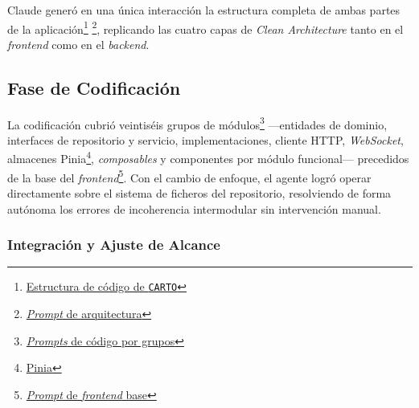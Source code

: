 Claude generó en una única interacción la estructura completa de ambas partes de la aplicación\footnote{\href{https://github.com/alu0101549491/TFG-Fabian-Gonzalez-Lence/blob/main/resources/project-structures/4-CartographicProjectManager.md}{Estructura de código de \texttt{CARTO}}} \footnote{\href{https://github.com/alu0101549491/TFG-Fabian-Gonzalez-Lence/blob/main/resources/prompts/4-CartographicProjectManager/1-Inicializacion/architecture.prompt.md}{\textit{Prompt} de arquitectura}}, replicando las cuatro capas de \textit{Clean Architecture} tanto en el \textit{frontend} como en el \textit{backend}.

\subsection{Fase de Codificación}

La codificación cubrió veintiséis grupos de módulos\footnote{\href{https://github.com/alu0101549491/TFG-Fabian-Gonzalez-Lence/tree/main/resources/prompts/4-CartographicProjectManager/3-CodigoPorGruposdeModulos}{\textit{Prompts} de código por grupos}} ---entidades de dominio, interfaces de repositorio y servicio, implementaciones, cliente HTTP, \textit{WebSocket}, almacenes Pinia\footnote{\href{https://pinia.vuejs.org/}{Pinia}}, \textit{composables} y componentes por módulo funcional--- precedidos de la base del \textit{frontend}\footnote{\href{https://github.com/alu0101549491/TFG-Fabian-Gonzalez-Lence/blob/main/resources/prompts/4-CartographicProjectManager/2-CodigoFrontend/frontend.prompt.md}{\textit{Prompt} de \textit{frontend} base}}. Con el cambio de enfoque, el agente logró operar directamente sobre el sistema de ficheros del repositorio, resolviendo de forma autónoma los errores de incoherencia intermodular sin intervención manual.

\subsubsection{Integración y Ajuste de Alcance}

